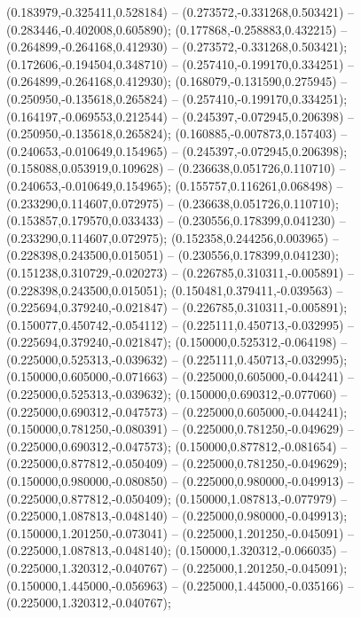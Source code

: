  (0.183979,-0.325411,0.528184) -- (0.273572,-0.331268,0.503421) -- (0.283446,-0.402008,0.605890);
 (0.177868,-0.258883,0.432215) -- (0.264899,-0.264168,0.412930) -- (0.273572,-0.331268,0.503421);
 (0.172606,-0.194504,0.348710) -- (0.257410,-0.199170,0.334251) -- (0.264899,-0.264168,0.412930);
 (0.168079,-0.131590,0.275945) -- (0.250950,-0.135618,0.265824) -- (0.257410,-0.199170,0.334251);
 (0.164197,-0.069553,0.212544) -- (0.245397,-0.072945,0.206398) -- (0.250950,-0.135618,0.265824);
 (0.160885,-0.007873,0.157403) -- (0.240653,-0.010649,0.154965) -- (0.245397,-0.072945,0.206398);
 (0.158088,0.053919,0.109628) -- (0.236638,0.051726,0.110710) -- (0.240653,-0.010649,0.154965);
 (0.155757,0.116261,0.068498) -- (0.233290,0.114607,0.072975) -- (0.236638,0.051726,0.110710);
 (0.153857,0.179570,0.033433) -- (0.230556,0.178399,0.041230) -- (0.233290,0.114607,0.072975);
 (0.152358,0.244256,0.003965) -- (0.228398,0.243500,0.015051) -- (0.230556,0.178399,0.041230);
 (0.151238,0.310729,-0.020273) -- (0.226785,0.310311,-0.005891) -- (0.228398,0.243500,0.015051);
 (0.150481,0.379411,-0.039563) -- (0.225694,0.379240,-0.021847) -- (0.226785,0.310311,-0.005891);
 (0.150077,0.450742,-0.054112) -- (0.225111,0.450713,-0.032995) -- (0.225694,0.379240,-0.021847);
 (0.150000,0.525312,-0.064198) -- (0.225000,0.525313,-0.039632) -- (0.225111,0.450713,-0.032995);
 (0.150000,0.605000,-0.071663) -- (0.225000,0.605000,-0.044241) -- (0.225000,0.525313,-0.039632);
 (0.150000,0.690312,-0.077060) -- (0.225000,0.690312,-0.047573) -- (0.225000,0.605000,-0.044241);
 (0.150000,0.781250,-0.080391) -- (0.225000,0.781250,-0.049629) -- (0.225000,0.690312,-0.047573);
 (0.150000,0.877812,-0.081654) -- (0.225000,0.877812,-0.050409) -- (0.225000,0.781250,-0.049629);
 (0.150000,0.980000,-0.080850) -- (0.225000,0.980000,-0.049913) -- (0.225000,0.877812,-0.050409);
 (0.150000,1.087813,-0.077979) -- (0.225000,1.087813,-0.048140) -- (0.225000,0.980000,-0.049913);
 (0.150000,1.201250,-0.073041) -- (0.225000,1.201250,-0.045091) -- (0.225000,1.087813,-0.048140);
 (0.150000,1.320312,-0.066035) -- (0.225000,1.320312,-0.040767) -- (0.225000,1.201250,-0.045091);
 (0.150000,1.445000,-0.056963) -- (0.225000,1.445000,-0.035166) -- (0.225000,1.320312,-0.040767);
